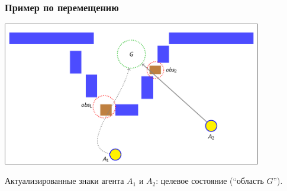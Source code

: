 \documentclass[default]{beamer}
\begin{document}
	\begin{frame}
		\frametitle{Пример по перемещению}
		
		\begin{center}
			\includegraphics[page=171,width=0.85\textwidth]{examples/slides_colored}
		\end{center}
		\par\bigskip
		Актуализированные знаки агента $A_1$ и $A_2$: целевое состояние (``область $G$'').
	\end{frame}
			
\end{document}
